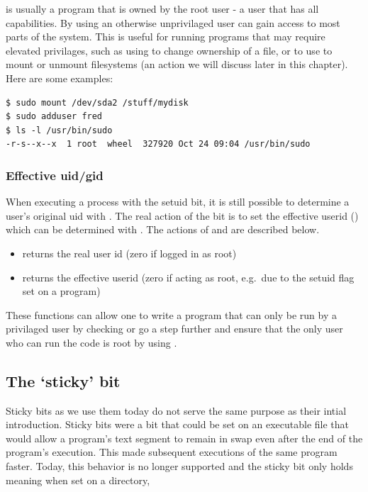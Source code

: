  is usually a program that is owned by the root user - a user that has all capabilities. By using  an otherwise unprivilaged user can gain access to most parts of the system. This is useful for running programs that may require elevated privilages, such as using  to change ownership of a file, or to use  to mount or unmount filesystems (an action we will discuss later in this chapter). Here are some examples:

\begin{lstlisting}
$ sudo mount /dev/sda2 /stuff/mydisk
$ sudo adduser fred
$ ls -l /usr/bin/sudo
-r-s--x--x  1 root  wheel  327920 Oct 24 09:04 /usr/bin/sudo
\end{lstlisting}

\subsubsection{Effective uid/gid}

When executing a process with the setuid bit, it is still possible to determine a user's original uid with . The real action of the  bit is to set the effective userid () which can be determined with . The actions of  and  are described below.

\begin{itemize}
\tightlist
\item
   returns the real user id (zero if logged in as root)
\item
   returns the effective userid (zero if acting as root, e.g.~due to the setuid flag set on a program)
\end{itemize}

These functions can allow one to write a program that can only be run by a privilaged user by checking  or go a step further and ensure that the only user who can run the code is root by using .

\subsection{The `sticky' bit}

Sticky bits as we use them today do not serve the same purpose as their intial introduction. Sticky bits were a bit that could be set on an executable file that would allow a program's text segment to remain in swap even after the end of the program's execution. This made subsequent executions of the same program faster. Today, this behavior is no longer supported and the sticky bit only holds meaning when set on a directory,

